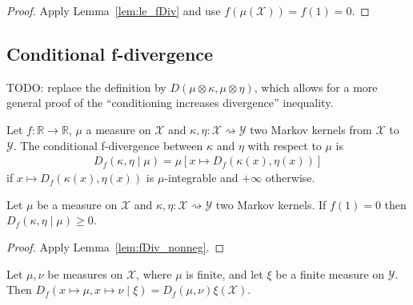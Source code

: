 \begin{proof}\leanok
{}
Apply Lemma~\ref{lem:le_fDiv} and use $f(\mu(\mathcal X)) = f(1) = 0$.
\end{proof}


\subsection{Conditional f-divergence}

TODO: replace the definition by $D(\mu \otimes \kappa, \mu \otimes \eta)$, which allows for a more general proof of the ``conditioning increases divergence'' inequality.

\begin{definition}
  \label{def:condFDiv}
  \leanok
  Let $f : \mathbb{R} \to \mathbb{R}$, $\mu$ a measure on $\mathcal X$ and $\kappa, \eta : \mathcal X \rightsquigarrow \mathcal Y$ two Markov kernels from $\mathcal X$ to $\mathcal Y$. The conditional f-divergence between $\kappa$ and $\eta$ with respect to $\mu$ is
  \begin{align*}
  D_f(\kappa, \eta \mid \mu) = \mu\left[x \mapsto D_f(\kappa(x), \eta(x))\right]
  \end{align*}
  if $x \mapsto D_f(\kappa(x), \eta(x))$ is $\mu$-integrable and $+\infty$ otherwise.
\end{definition}

\begin{lemma}
  \label{lem:condFDiv_nonneg}
  \leanok
  Let $\mu$ be a measure on $\mathcal X$ and $\kappa, \eta : \mathcal X \rightsquigarrow \mathcal Y$ two Markov kernels. If $f(1) = 0$ then $D_f(\kappa, \eta \mid \mu) \ge 0$.
\end{lemma}

\begin{proof}\leanok
{}
Apply Lemma~\ref{lem:fDiv_nonneg}.
\end{proof}

\begin{lemma}
  \label{lem:condFDiv_const}
  \leanok
  Let $\mu, \nu$ be measures on $\mathcal X$, where $\mu$ is finite, and let $\xi$ be a finite measure on $\mathcal Y$.
  Then $D_f(x \mapsto \mu, x \mapsto \nu \mid \xi) = D_f(\mu, \nu) \xi (\mathcal X)$.
\end{lemma}

